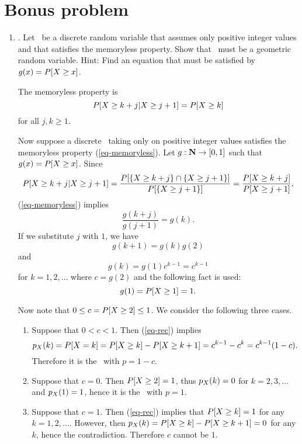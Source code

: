 \section*{Bonus problem}

\begin{enumerate}
	\item {}.
	Let \X\ be a discrete random variable that assumes only positive integer
	values and that satisfies the memoryless property.
	Show that \X\ must be a geometric random variable.
	Hint: Find an equation that must be satisfied by $g(x) = P[X \geq x]$.
	\ifdefined\sol
	\begin{solution}
		The memoryless property is
		\begin{equation}
		\label{eq-memoryless}
			P[X\geq k+j|X\geq j+1] = P[X\geq k]
		\end{equation}
		for all $j,k\geq1$.

		Now suppose a discrete \randvar\ taking only on positive integer values
		satisfies the memoryless property (\ref{eq-memoryless}).
		Let $g:{\mbox{\bf N}} \to [0,1]$
		such that $g(x) = P[X\geq x]$.
		Since
		\[
			P[X\geq k+j|X\geq j+1] =
			\frac{P[\{X\geq k+j\}\cap \{X\geq j+1\}]}{P[\{X\geq j+1\}]} =
			\frac{P[X\geq k+j]}{P[X\geq j+1]},
		\]
		(\ref{eq-memoryless}) implies
		\[
			\frac{g(k+j)}{g(j+1)} = g(k).
		\]
		If we substitute $j$ with $1$, we have
		\[
			g(k+1) = g(k)g(2)
		\]
		and
		\begin{equation}
		\label{eq-rec}
			g(k) = g(1) c ^{k-1} = c^{k-1}
		\end{equation}
		for $k=1,2,\ldots$ where $c = g(2)$
		and the following fact is used:
		\[ g(1)=P[X\geq 1] = 1. \]

		Now note that $0\leq c=P[X\geq 2] \leq 1$.
		We consider the following three cases.
		\begin{enumerate}
			\item
			Suppose that $0<c<1$.
			Then (\ref{eq-rec}) implies
			\[
				p_{X}(k) =
				P[X=k] = P[X\geq k ] - P[X\geq k+1]
				= c^{k-1} - c^k
				= c^{k-1} (1-c).
			\]
			Therefore it is the \geomrv\ with $p=1-c$.

			\item Suppose that $c=0$.
			Then $P[X\geq2] = 1$,
			thus $p_{X}(k) = 0$ for $k=2,3,\ldots$ and $p_{X}(1) = 1$,
			hence it is the \geomrv\ with $p=1$.

			\item Suppose that $c=1$.
			Then (\ref{eq-rec}) implies that $P[X\geq k]=1$
			for any $k=1,2,\ldots$.
			However, then $p_{X}(k) = P[X\geq k] - P[X\geq k+1]
			= 0$ for any $k$, hence the contradiction.
			Therefore $c$ cannot be $1$.
		\end{enumerate}


\end{solution}
\end{enumerate}
